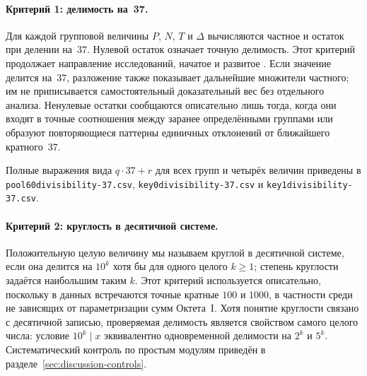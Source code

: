 \documentclass[11pt,a4paper]{article}
\renewcommand{\_}{\origunderscore\allowbreak}
\begin{document}
\paragraph{Критерий 1: делимость на~37.}
Для каждой групповой величины $P$, $N$, $T$ и $\Delta$ вычисляются
частное и остаток при делении на~$37$. Нулевой остаток означает точную
делимость. Этот критерий продолжает направление исследований,
начатое \citet{makukov2013} и развитое \citet{panov2024}. Если значение
делится на~$37$, разложение также показывает дальнейшие множители
частного; им не приписывается самостоятельный доказательный вес без
отдельного анализа. Ненулевые остатки сообщаются описательно лишь тогда, когда они
входят в точные соотношения между заранее определёнными группами или
образуют повторяющиеся паттерны единичных отклонений от ближайшего
кратного~$37$.

Полные выражения вида $q\cdot37+r$ для всех групп и четырёх величин
приведены в
\texttt{pool60\_divisibility-37.csv},
\texttt{key0\_divisibility-37.csv} и
\texttt{key1\_divisibility-37.csv}.

\paragraph{Критерий 2: круглость в десятичной системе.}
Положительную целую величину мы называем круглой в десятичной системе,
если она делится на $10^k$ хотя бы для одного целого $k\geq1$; степень
круглости задаётся наибольшим таким $k$. Этот критерий используется
описательно, поскольку в данных встречаются точные кратные $100$ и
$1000$, в частности среди не зависящих от параметризации сумм
Октета~I. Хотя понятие круглости связано с десятичной записью, проверяемая
делимость является свойством самого целого числа: условие
$10^k\mid x$ эквивалентно одновременной делимости на $2^k$ и $5^k$.
Систематический контроль по простым модулям приведён в
разделе~\ref{sec:discussion-controls}.
\end{document}
